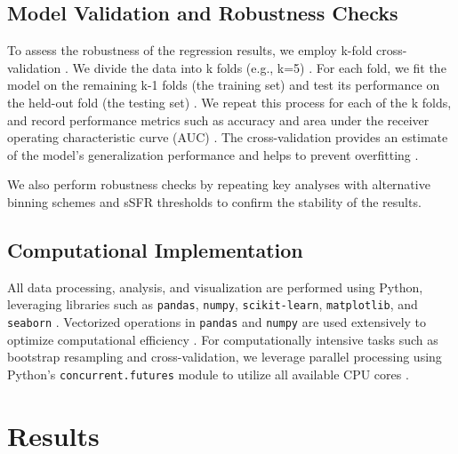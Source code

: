 \documentclass[twocolumn]{aastex631}
\begin{document}
\subsection{Model Validation and Robustness Checks}
To assess the robustness of the regression results, we employ k-fold cross-validation \citep{hammond2024identifyingfittingeclipsemaps,sweet2024predictingexoplanetaryfeaturesresidual}. We divide the data into k folds (e.g., k=5) \citep{sweet2024predictingexoplanetaryfeaturesresidual}. For each fold, we fit the model on the remaining k-1 folds (the training set) and test its performance on the held-out fold (the testing set) \citep{sweet2024predictingexoplanetaryfeaturesresidual}. We repeat this process for each of the k folds, and record performance metrics such as accuracy and area under the receiver operating characteristic curve (AUC) \citep{hammond2024identifyingfittingeclipsemaps,sweet2024predictingexoplanetaryfeaturesresidual}. The cross-validation provides an estimate of the model's generalization performance and helps to prevent overfitting \citep{hammond2024identifyingfittingeclipsemaps,sweet2024predictingexoplanetaryfeaturesresidual}.

We also perform robustness checks by repeating key analyses with alternative binning schemes \citep{leslie2021modebymoderelativebinningfast,dainotti2024newbinningmethodchoose,chen2024evolutionxraygalaxycluster} and sSFR thresholds to confirm the stability of the results.

\subsection{Computational Implementation}
All data processing, analysis, and visualization are performed using Python, leveraging libraries such as \texttt{pandas}, \texttt{numpy}, \texttt{scikit-learn}, \texttt{matplotlib}, and \texttt{seaborn} \citep{giri2025astronomycalcpythontoolkitteaching}. Vectorized operations in \texttt{pandas} and \texttt{numpy} are used extensively to optimize computational efficiency \citep{turk2011highperformanceastrophysicalsimulationsanalysis}. For computationally intensive tasks such as bootstrap resampling and cross-validation, we leverage parallel processing using Python's \texttt{concurrent.futures} module to utilize all available CPU cores \citep{turk2011highperformanceastrophysicalsimulationsanalysis}.

\section{Results}
\label{sec:results}
\end{document}
